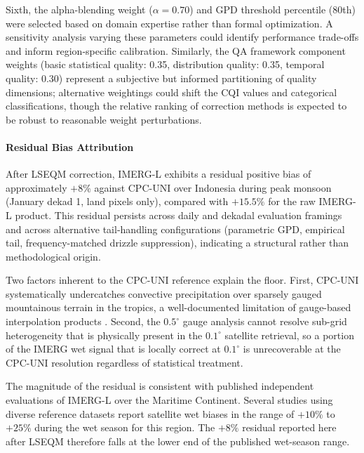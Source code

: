 \documentclass[11pt,a4paper]{article}
\begin{document}
Sixth, the alpha-blending weight (\(\alpha = 0.70\)) and GPD threshold
percentile (80th) were selected based on domain expertise rather than
formal optimization. A sensitivity analysis varying these parameters
could identify performance trade-offs and inform region-specific
calibration. Similarly, the QA framework component weights (basic
statistical quality: 0.35, distribution quality: 0.35, temporal quality:
0.30) represent a subjective but informed partitioning of quality
dimensions; alternative weightings could shift the CQI values and
categorical classifications, though the relative ranking of correction
methods is expected to be robust to reasonable weight perturbations.

\paragraph{Residual Bias
Attribution}\label{residual-bias-attribution}

After LSEQM correction, IMERG-L exhibits a residual positive bias of
approximately \(+8\%\) against CPC-UNI over Indonesia during peak
monsoon (January dekad 1, land pixels only), compared with \(+15.5\%\)
for the raw IMERG-L product. This residual persists across daily and
dekadal evaluation framings and across alternative tail-handling
configurations (parametric GPD, empirical tail, frequency-matched
drizzle suppression), indicating a structural rather than methodological
origin.

Two factors inherent to the CPC-UNI reference explain the floor. First,
CPC-UNI systematically undercatches convective precipitation over
sparsely gauged mountainous terrain in the tropics, a well-documented
limitation of gauge-based interpolation products \cite{ref36,ref37}. Second,
the \(0.5^{\circ}\) gauge analysis cannot resolve sub-grid heterogeneity
that is physically present in the \(0.1^{\circ}\) satellite retrieval,
so a portion of the IMERG wet signal that is locally correct at
\(0.1^{\circ}\) is unrecoverable at the CPC-UNI resolution regardless of
statistical treatment.

The magnitude of the residual is consistent with published independent
evaluations of IMERG-L over the Maritime Continent. Several studies
using diverse reference datasets \cite{ref31,ref32,ref33,ref38,ref39,ref47} report
satellite wet biases in the range of \(+10\%\) to \(+25\%\) during the
wet season for this region. The \(+8\%\) residual reported here after
LSEQM therefore falls at the lower end of the published wet-season
range.
\end{document}
